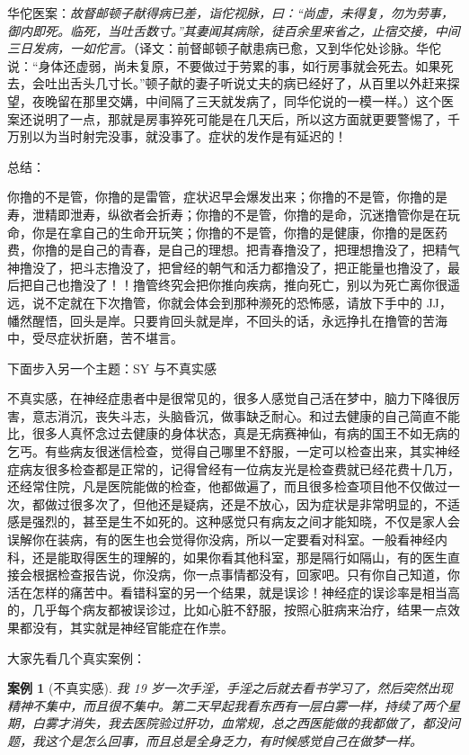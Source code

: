 \documentclass{ctexart}
\newtheorem{case}{案例}
\begin{document}
华佗医案：{\it 故督邮顿子献得病已差，诣佗视脉，曰：“尚虚，未得复，勿为劳事，御内即死。临死，当吐舌数寸。”其妻闻其病除，徒百余里来省之，止宿交接，中间三日发病，一如佗言。}（译文：前督邮顿子献患病已愈，又到华佗处诊脉。华佗说：“身体还虚弱，尚未复原，不要做过于劳累的事，如行房事就会死去。如果死去，会吐出舌头几寸长。”顿子献的妻子听说丈夫的病已经好了，从百里以外赶来探望，夜晚留在那里交媾，中间隔了三天就发病了，同华佗说的一模一样。）这个医案还说明了一点，那就是房事猝死可能是在几天后，所以这方面就更要警惕了，千万别以为当时射完没事，就没事了。症状的发作是有延迟的！

总结：

你撸的不是管，你撸的是雷管，症状迟早会爆发出来；你撸的不是管，你撸的是寿，泄精即泄寿，纵欲者会折寿；你撸的不是管，你撸的是命，沉迷撸管你是在玩命，你是在拿自己的生命开玩笑；你撸的不是管，你撸的是健康，你撸的是医药费，你撸的是自己的青春，是自己的理想。把青春撸没了，把理想撸没了，把精气神撸没了，把斗志撸没了，把曾经的朝气和活力都撸没了，把正能量也撸没了，最后把自己也撸没了！！撸管终究会把你推向疾病，推向死亡，别以为死亡离你很遥远，说不定就在下次撸管，你就会体会到那种濒死的恐怖感，请放下手中的 JJ，幡然醒悟，回头是岸。只要肯回头就是岸，不回头的话，永远挣扎在撸管的苦海中，受尽症状折磨，苦不堪言。

下面步入另一个主题：SY 与不真实感

不真实感，在神经症患者中是很常见的，很多人感觉自己活在梦中，脑力下降很厉害，意志消沉，丧失斗志，头脑昏沉，做事缺乏耐心。和过去健康的自己简直不能比，很多人真怀念过去健康的身体状态，真是无病赛神仙，有病的国王不如无病的乞丐。有些病友很迷信检查，觉得自己哪里不舒服，一定可以检查出来，其实神经症病友很多检查都是正常的，记得曾经有一位病友光是检查费就已经花费十几万，还经常住院，凡是医院能做的检查，他都做遍了，而且很多检查项目他不仅做过一次，都做过很多次了，但他还是疑病，还是不放心，因为症状是非常明显的，不适感是强烈的，甚至是生不如死的。这种感觉只有病友之间才能知晓，不仅是家人会误解你在装病，有的医生也会觉得你没病，所以一定要看对科室。一般看神经内科，还是能取得医生的理解的，如果你看其他科室，那是隔行如隔山，有的医生直接会根据检查报告说，你没病，你一点事情都没有，回家吧。只有你自己知道，你活在怎样的痛苦中。看错科室的另一个结果，就是误诊！神经症的误诊率是相当高的，几乎每个病友都被误诊过，比如心脏不舒服，按照心脏病来治疗，结果一点效果都没有，其实就是神经官能症在作祟。

大家先看几个真实案例：

\begin{case}[不真实感]
    我 19 岁一次手淫，手淫之后就去看书学习了，然后突然出现精神不集中，而且很不集中。第二天早起我看东西有一层白雾一样，持续了两个星期，白雾才消失，我去医院验过肝功，血常规，总之西医能做的我都做了，都没问题，我这个是怎么回事，而且总是全身乏力，有时候感觉自己在做梦一样。
\end{case}
\end{document}
